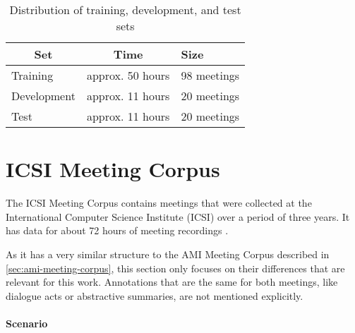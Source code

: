 \begin{table}[h]
\centering
\begin{tabular}{@{}lll@{}}
\toprule
\multicolumn{1}{c}{\textbf{Set}} & \multicolumn{1}{c}{\textbf{Time}} & \textbf{Size} \\ \midrule
Training                         & approx. 50 hours                  & 98 meetings   \\
Development                      & approx. 11 hours                  & 20 meetings   \\
Test                             & approx. 11 hours                  & 20 meetings   \\ \bottomrule
\end{tabular}
\caption[Distribution of training, development, and test sets]{Distribution of training, development, and test sets \cite{amiWebsite}}
\label{tab:meeting-time-distribution}
\end{table}


\section{ICSI Meeting Corpus}\label{sec:icsi-corpus}

The ICSI Meeting Corpus contains meetings that were collected at the International Computer Science Institute (ICSI) over a period of three years.
It has data for about 72 hours of meeting recordings \cite{Janin}.

As it has a very similar structure to the AMI Meeting Corpus described in \cref{sec:ami-meeting-corpus}, this section only focuses on their differences that are relevant for this work.
Annotations that are the same for both meetings, like dialogue acts or abstractive summaries, are not mentioned explicitly.

\paragraph{Scenario}


